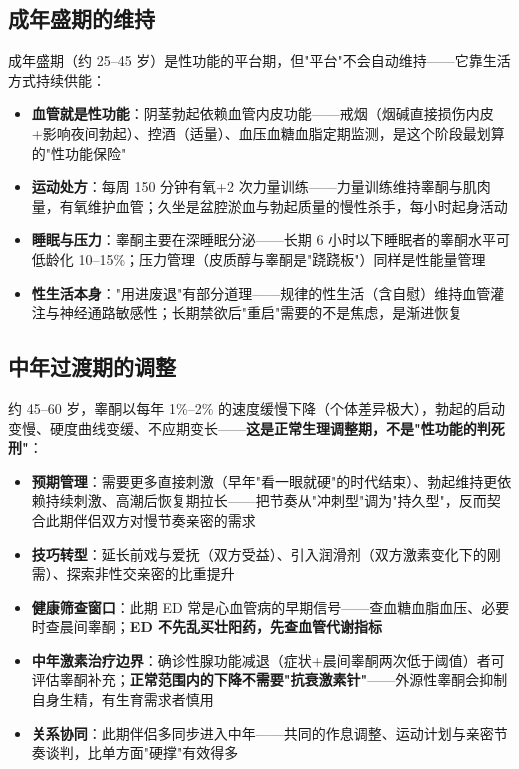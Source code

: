 \documentclass[12pt,a4paper,twoside]{ctexbook}
\begin{document}
\subsection{成年盛期的维持}


成年盛期（约 25--45 岁）是性功能的平台期，但"平台"不会自动维持——它靠生活方式持续供能：

\begin{itemize}
	\item \textbf{血管就是性功能}：阴茎勃起依赖血管内皮功能——戒烟（烟碱直接损伤内皮+影响夜间勃起）、控酒（适量）、血压血糖血脂定期监测，是这个阶段最划算的"性功能保险"
	\item \textbf{运动处方}：每周 150 分钟有氧+2 次力量训练——力量训练维持睾酮与肌肉量，有氧维护血管；久坐是盆腔淤血与勃起质量的慢性杀手，每小时起身活动
	\item \textbf{睡眠与压力}：睾酮主要在深睡眠分泌——长期 6 小时以下睡眠者的睾酮水平可低龄化 10--15\%；压力管理（皮质醇与睾酮是"跷跷板"）同样是性能量管理
	\item \textbf{性生活本身}："用进废退"有部分道理——规律的性生活（含自慰）维持血管灌注与神经通路敏感性；长期禁欲后"重启"需要的不是焦虑，是渐进恢复
\end{itemize}

\subsection{中年过渡期的调整}


约 45--60 岁，睾酮以每年 1\%--2\% 的速度缓慢下降（个体差异极大），勃起的启动变慢、硬度曲线变缓、不应期变长——\textbf{这是正常生理调整期，不是"性功能的判死刑"}：

\begin{itemize}
	\item \textbf{预期管理}：需要更多直接刺激（早年"看一眼就硬"的时代结束）、勃起维持更依赖持续刺激、高潮后恢复期拉长——把节奏从"冲刺型"调为"持久型"，反而契合此期伴侣双方对慢节奏亲密的需求
	\item \textbf{技巧转型}：延长前戏与爱抚（双方受益）、引入润滑剂（双方激素变化下的刚需）、探索非性交亲密的比重提升
	\item \textbf{健康筛查窗口}：此期 ED 常是心血管病的早期信号——查血糖血脂血压、必要时查晨间睾酮；\textbf{ED 不先乱买壮阳药，先查血管代谢指标}
	\item \textbf{中年激素治疗边界}：确诊性腺功能减退（症状+晨间睾酮两次低于阈值）者可评估睾酮补充；\textbf{正常范围内的下降不需要"抗衰激素针"}——外源性睾酮会抑制自身生精，有生育需求者慎用
	\item \textbf{关系协同}：此期伴侣多同步进入中年——共同的作息调整、运动计划与亲密节奏谈判，比单方面"硬撑"有效得多
\end{itemize}
\end{document}
